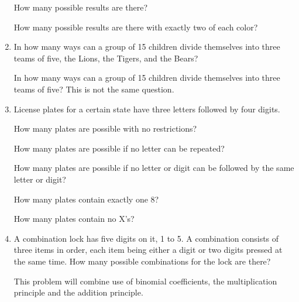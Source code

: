 \documentclass[12pt]{article}
\begin{document}
\begin{enumerate}
How many possible results are there?

How many possible results are there with exactly two of each color?

\newpage

\item  In how many ways can a group of 15 children divide themselves into three teams of five, the Lions, the Tigers, and the Bears?

In how many ways can a group of 15 children divide themselves into three teams of five?  This is not the same question.

\newpage

\item  License plates for a certain state have three letters followed by four digits.

How many plates are possible with no restrictions?

How many plates are possible if no letter can be repeated?

How many plates are possible if no letter or digit can be followed by the same letter or digit?

How many plates contain exactly one 8?

How many plates contain no X's?

\newpage

\item  A combination lock has five digits on it, 1 to 5.  A combination consists of three items in order, each item being either a digit
or two digits pressed at the same time.  How many possible combinations for the lock are there?

This problem will combine use of binomial coefficients, the multiplication principle and the addition principle.

\end{enumerate}
\end{document}
